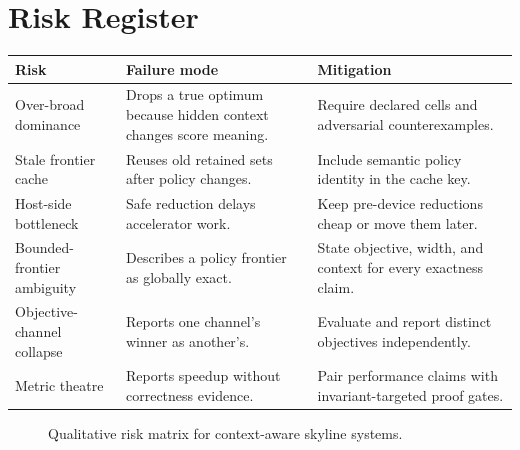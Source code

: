 \documentclass[11pt,oneside]{article}
\theoremstyle{definition}
\begin{document}
\section{Risk Register}

\begin{longtable}{>{\raggedright\arraybackslash}p{}>{\raggedright\arraybackslash}p{}>{\raggedright\arraybackslash}p{}}
\toprule
\textbf{Risk} & \textbf{Failure mode} & \textbf{Mitigation} \\
\midrule
Over-broad dominance & Drops a true optimum because hidden context changes score meaning. & Require declared cells and adversarial counterexamples. \\
Stale frontier cache & Reuses old retained sets after policy changes. & Include semantic policy identity in the cache key. \\
Host-side bottleneck & Safe reduction delays accelerator work. & Keep pre-device reductions cheap or move them later. \\
Bounded-frontier ambiguity & Describes a policy frontier as globally exact. & State objective, width, and context for every exactness claim. \\
Objective-channel collapse & Reports one channel's winner as another's. & Evaluate and report distinct objectives independently. \\
Metric theatre & Reports speedup without correctness evidence. & Pair performance claims with invariant-targeted proof gates. \\
\bottomrule
\end{longtable}

\begin{figure}[H]
\centering
{}
\caption{Qualitative risk matrix for context-aware skyline systems.}
\end{figure}
\end{document}
